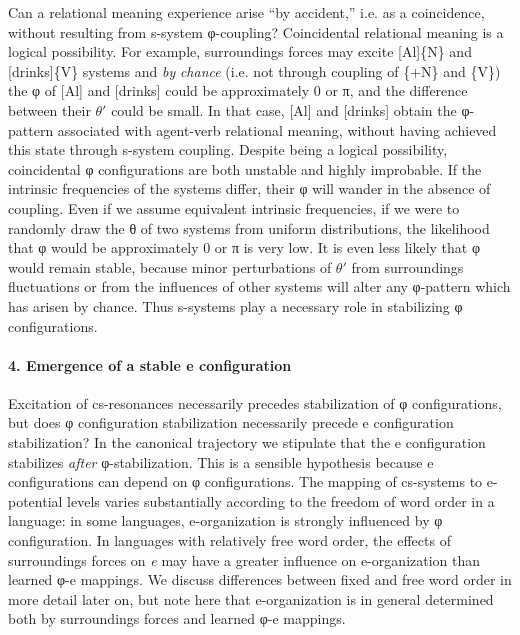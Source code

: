   Can a relational meaning experience arise “by accident,” i.e. as a coincidence, without resulting from s-system φ-coupling? Coincidental relational meaning is a logical possibility. For example, surroundings forces may excite [Al]\{N\} and [drinks]\{V\} systems and \textit{by} \textit{chance} (i.e. not through coupling of \{+N\} and \{V\}) the φ of [Al] and [drinks] could be approximately 0 or π, and the difference between their $\theta ′$ could be small. In that case, [Al] and [drinks] obtain the φ-pattern associated with agent-verb relational meaning, without having achieved this state through s-system coupling. Despite being a logical possibility, coincidental φ configurations are both unstable and highly improbable. If the intrinsic frequencies of the systems differ, their φ will wander in the absence of coupling. Even if we assume equivalent intrinsic frequencies, if we were to randomly draw the θ of two systems from uniform distributions, the likelihood that φ would be approximately 0 or π is very low. It is even less likely that φ would remain stable, because minor perturbations of $\theta ′$ from surroundings fluctuations or from the influences of other systems will alter any φ-pattern which has arisen by chance. Thus s-systems play a necessary role in stabilizing φ configurations.

\paragraph{4. Emergence of a stable e configuration}

Excitation of cs-resonances necessarily precedes stabilization of φ configurations, but does φ configuration stabilization necessarily precede e configuration stabilization? In the canonical trajectory we stipulate that the e configuration stabilizes \textit{after} φ-stabilization. This is a sensible hypothesis because e configurations can depend on φ configurations. The mapping of cs-systems to e-potential levels varies substantially according to the freedom of word order in a language: in some languages, e-organization is strongly influenced by φ configuration. In languages with relatively free word order, the effects of surroundings forces on \textit{e} may have a greater influence on e-organization than learned φ-e mappings. We discuss differences between fixed and  free word order in more detail later on, but note here that e-organization is in general determined both by surroundings forces and learned φ-e mappings.

